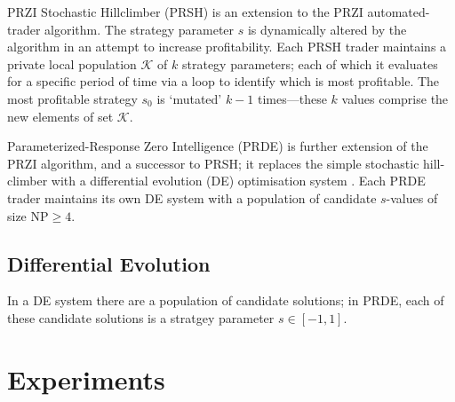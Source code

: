 \documentclass[conference]{IEEEtran}
\begin{document}
PRZI Stochastic Hillclimber (PRSH) \cite{CliffMetapopulation} is an extension to the PRZI automated-trader algorithm.
The strategy parameter $s$ is dynamically altered by the algorithm in an attempt to increase profitability.
Each PRSH trader maintains a private local population $\mathcal{K}$ of $k$ strategy parameters; each of which it evaluates for a specific period of time via a loop to identify which is most profitable.
The most profitable strategy $s_0$ is `mutated' $k-1$ times---these $k$ values comprise the new elements of set $\mathcal{K}$.

Parameterized-Response Zero Intelligence (PRDE) is further extension of the PRZI algorithm, and a successor to PRSH; it replaces the simple stochastic hill-climber with a differential evolution (DE) optimisation system \cite{StornPrice}.
Each PRDE trader maintains its own DE system with a population of candidate $s$-values of size $\mathrm{NP}\ge4$.

\subsection{Differential Evolution}

In a DE system there are a population of candidate solutions; in PRDE, each of these candidate solutions is a stratgey parameter $s\in[-1,1]$.

\section{Experiments}

\cite{BSE} \cite{BSEPaper}



\end{document}
